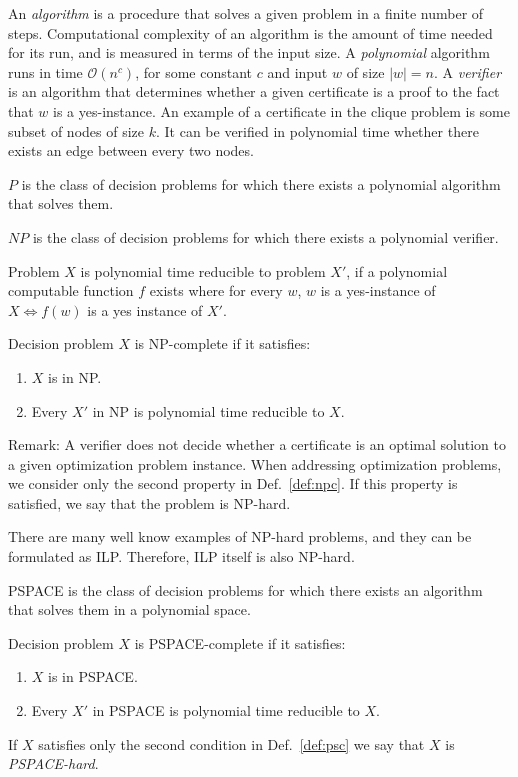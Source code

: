 An \emph{algorithm} is a procedure that solves a given problem in a finite number of steps.
Computational complexity of an algorithm is the amount of time needed for its run, and is measured in terms of the input size.
A \emph{polynomial} algorithm runs in time $\mathcal{O}(n^c)$, for some constant $c$ and input $w$ of size $|w|=n$.
A \emph{verifier} is an algorithm that determines whether a given certificate is a proof to the fact that $w$ is a yes-instance.
An example of a certificate in the clique problem is some subset of nodes of size $k$.
It can be verified in polynomial time whether there exists an edge between every two nodes.
\begin{definition}
	$P$ is the class of decision problems for which there exists a polynomial algorithm that solves them.
\end{definition}
\begin{definition}
	$NP$ is the class of decision problems for which there exists a polynomial verifier. 
\end{definition}
\begin{definition}
	Problem $X$ is polynomial time reducible to problem $X'$, if a polynomial computable function $f$ exists where for every $w$, 
	$w$ is a yes-instance of $X\Leftrightarrow f(w)$ is a yes instance of $X'$.
\end{definition}
\begin{definition}\label{def:npc}
	Decision problem $X$ is NP-complete if it satisfies:
	\begin{enumerate}
		\item $X$ is in NP.
		\item Every $X'$ in NP is polynomial time reducible to $X$.
	\end{enumerate}
\end{definition}
Remark:
A verifier does not decide whether a certificate is an optimal solution to a given optimization problem instance. 
When addressing optimization problems, we consider only the second property in Def.~\ref{def:npc}. 
If this property is satisfied, we say that the problem is NP-hard.

There are many well know examples of NP-hard problems, and they can be formulated as ILP.
Therefore, ILP itself is also NP-hard.

\begin{definition}
	PSPACE is the class of decision problems for which there exists an algorithm that solves them in a polynomial space.
\end{definition}
\begin{definition}\label{def:psc}
	Decision problem $X$ is PSPACE-complete if it satisfies:
	\begin{enumerate}
		\item $X$ is in PSPACE.
		\item Every $X'$ in PSPACE is polynomial time reducible to $X$.
	\end{enumerate}
\end{definition}
If $X$ satisfies only the second condition in Def.~\ref{def:psc} we say that $X$ is \emph{PSPACE-hard}.

